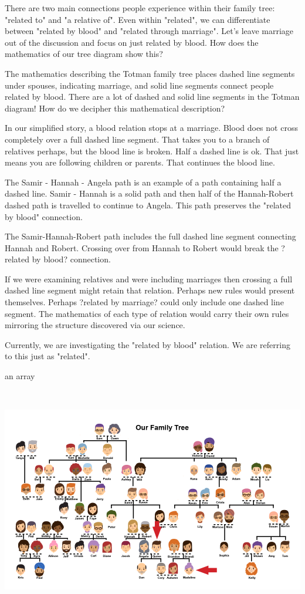 \documentclass{ximera}
\begin{document}
There are two main connections people experience within their family tree: "related to" and "a relative of". Even within "related", we can differentiate between "related by blood" and "related through marriage". Let's leave marriage out of the discussion and focus on just related by blood.  How does the mathematics of our tree diagram show this?

The mathematics describing the Totman family tree places dashed line segments under spouses, indicating marriage, and solid line segments connect people related by blood. There are a lot of dashed and solid line segments in the Totman diagram!  How do we decipher this mathematical description?

In our simplified story, a blood relation stops at a marriage.  Blood does not cross completely over a full dashed line segment. That takes you to a branch of relatives perhaps, but the blood line is broken.  Half a dashed line is ok.  That just means you are following children or parents.  That continues the blood line.

The Samir - Hannah - Angela path is an example of a path containing half a dashed line. Samir - Hannah is a solid path and then half of the Hannah-Robert dashed path is travelled to continue to Angela.  This path preserves the "related by blood" connection.

The Samir-Hannah-Robert path includes the full dashed line segment connecting Hannah and Robert.  Crossing over from Hannah to Robert would break the ?related by blood? connection.

If we were examining relatives and were including marriages then crossing a full dashed line segment might retain that relation. Perhaps new rules would present themselves. Perhaps ?related by marriage? could only include one dashed line segment.  The mathematics of each type of relation would carry their own rules mirroring the structure discovered via our science.

Currently, we are investigating the "related by blood" relation. We are referring to this just as "related".


an array
\begin{idea}
\quad \\
\begin{image}
\includegraphics{pics/Madeline_Quinn_arrow.png}
\end{image}
\end{idea}
\end{document}
